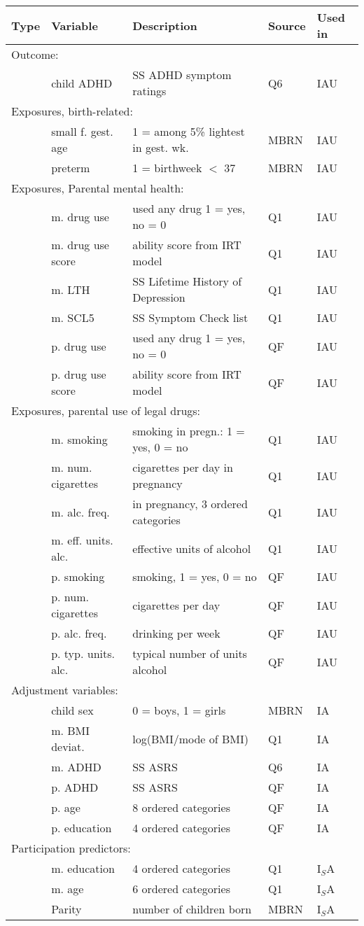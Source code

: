 \begin{tabular}{lllll}
		\hline
		Type & Variable & Description & Source & Used in\\ 
		\hline
		\multicolumn{5}{l}{Outcome:} \\
		& child ADHD & SS ADHD symptom ratings & Q6 & IAU\\ 
		\multicolumn{5}{l}{Exposures, birth-related:} \\
		& small f. gest. age & 1 = among 5\% lightest in gest. wk. & MBRN & IAU\\ 
		& preterm & 1 = birthweek $<$ 37 & MBRN & IAU\\ 
		\multicolumn{5}{l}{Exposures, Parental mental health:} \\
		& m. drug use & used any drug 1 = yes, no = 0 & Q1 & IAU\\ 
		& m. drug use score & ability score from IRT model & Q1 & IAU\\ 
		& m. LTH & SS Lifetime History of Depression & Q1 & IAU\\ 
		& m. SCL5 & SS Symptom Check list & Q1 & IAU\\ 
		& p. drug use & used any drug 1 = yes, no = 0 & QF & IAU\\ 
		& p. drug use score & ability score from IRT model & QF & IAU\\ 
		\multicolumn{5}{l}{Exposures, parental use of legal drugs:} \\
		& m. smoking & smoking in pregn.: 1 = yes, 0 = no & Q1 & IAU\\ 
		& m. num. cigarettes & cigarettes per day in pregnancy & Q1 & IAU\\ 
		& m. alc. freq. & in pregnancy, 3 ordered categories & Q1 & IAU\\ 
		& m. eff. units. alc. & effective units of alcohol & Q1 & IAU\\ 
		& p. smoking & smoking, 1 = yes, 0 = no & QF & IAU\\ 
		& p. num. cigarettes & cigarettes per day & QF & IAU\\ 
		& p. alc. freq. & drinking per week & QF & IAU\\ 
		& p. typ. units. alc. & typical number of units alcohol  & QF & IAU\\
		\multicolumn{5}{l}{Adjustment variables:} \\ 
		& child sex & 0 = boys, 1 = girls & MBRN & IA\\ 
		& m. BMI deviat. & log(BMI/mode of BMI) & Q1 & IA \\ 
		& m. ADHD & SS ASRS & Q6 & IA \\ 
		& p. ADHD & SS ASRS & QF & IA \\
		& p. age & 8 ordered categories & QF & IA \\ 
		& p. education & 4 ordered categories & QF & IA \\ 
		\multicolumn{5}{l}{Participation predictors:} \\ 
		& m. education & 4 ordered categories & Q1  & I$_S$A\\ 
		& m. age & 6 ordered categories & Q1  & I$_S$A\\ 
		& Parity & number of children born & MBRN  & I$_S$A\\ 
		\hline
	\end{tabular}